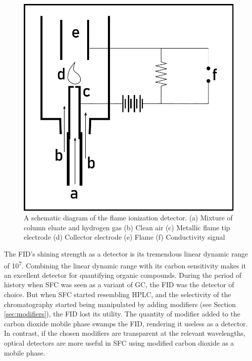 \begin{figure}
\centering
\includegraphics[width=\textwidth]{Figures/FIDSchematic.pdf}
\decoRule

\caption[FID diagram]{A schematic diagram of the flame ionization detector. (a)
Mixture of column eluate and hydrogen gas (b) Clean air (c) Metallic flame tip
electrode (d) Collector electrode (e) Flame (f) Conductivity signal}

\label{fig:fiddiagram}

\end{figure}

The FID's shining strength as a detector is its tremendous linear dynamic range
of 10\textsuperscript{7}. Combining the linear dynamic range with its carbon
sensitivity makes it an excellent detector for quantifying organic compounds.
During the period of history when SFC was seen as a variant of GC, the FID was
the detector of choice. But when SFC started resembling HPLC, and the
selectivity of the chromatography started being manipulated by adding modifiers
(see Section \ref{sec:modifiers}), the FID lost its utility. The quantity of
modifier added to the carbon dioxide mobile phase swamps the FID,
rendering it useless as a detector. In contrast, if the chosen modifiers are
transparent at the relevant wavelengths, optical detectors are more useful in
SFC using modified carbon dioxide as a mobile phase.


